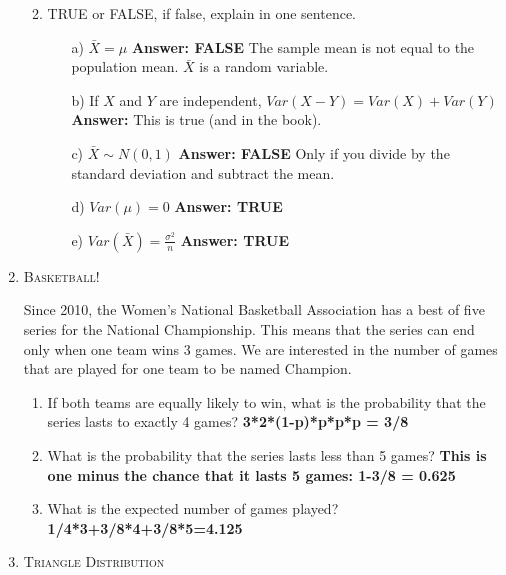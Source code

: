 \documentclass[11pt,letterpaper]{article}
\numberwithin{equation}{section}
\begin{document}
\begin{enumerate}[I]
\begin{enumerate}[1)]
\begin{enumerate}
\end{enumerate}
\item TRUE or FALSE, if false, explain in one sentence.
\begin{enumerate}
\item[a)] $\bar{X}=\mu$  \textbf{Answer: FALSE} The sample mean is not equal to the population mean.  $\bar{X}$ is a random variable.
\item[b)] If $X$ and $Y$ are independent, $Var(X-Y)=Var(X)+Var(Y)$ \textbf{Answer:}  This is true (and in the book).   
\item[c)] $\bar{X}\sim N(0,1)$  \textbf{Answer: FALSE}   Only if you divide by the standard deviation and subtract the mean.
\item[d)] $Var(\mu)=0$ \textbf{Answer: TRUE}  
\item[e)] $Var(\bar{X})=\frac{\sigma^2}{n}$ \textbf{Answer: TRUE}  
\end{enumerate}

\end{enumerate}
\pagebreak
\item \textsc{Basketball!} 

Since 2010, the Women's National Basketball Association has a best of five series for the National Championship.  This means that the series can end only when one team wins 3 games.  We are interested in the number of games that are played for one team to be named Champion.
\begin{enumerate}[1)]
\item If both teams are equally likely to win, what is the probability that the series lasts to exactly 4 games? \textbf{3*2*(1-p)*p*p*p = 3/8}
\item What is the probability that the series lasts less than 5 games?  \textbf{This is one minus the chance that it lasts 5 games: 1-3/8 = 0.625}
\item What is the expected number of games played?  \textbf{1/4*3+3/8*4+3/8*5=4.125}
\end{enumerate}

\item \textsc{Triangle Distribution} 




\end{enumerate}
\end{document}
